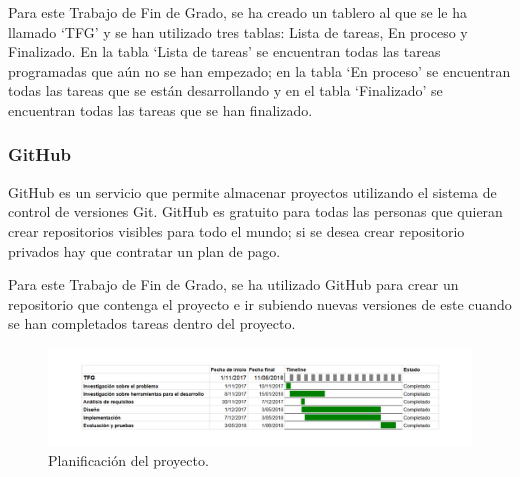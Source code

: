 Para este Trabajo de Fin de Grado, se ha creado un tablero al que se le ha llamado \enquote*{TFG} y se han utilizado tres tablas: Lista de tareas, En proceso y Finalizado. En la tabla \enquote*{Lista de tareas} se encuentran todas las tareas programadas que aún no se han empezado; en la tabla \enquote*{En proceso} se encuentran todas las tareas que se están desarrollando y en el tabla \enquote*{Finalizado} se encuentran todas las tareas que se han finalizado.
\subsubsection{GitHub}
GitHub \cite{github} es un servicio que permite almacenar proyectos utilizando el sistema de control de versiones Git. GitHub es gratuito para todas las personas que quieran crear repositorios visibles para todo el mundo; si se desea crear repositorio privados hay que contratar un plan de pago.\newline

Para este Trabajo de Fin de Grado, se ha utilizado GitHub para crear un repositorio que contenga el proyecto e ir subiendo nuevas versiones de este cuando se han completados tareas dentro del proyecto.\newline
\newpage
\begin{figure}[H]
	\centering
	\includegraphics[scale=0.55,angle=90]{imagenes/Gantt.png}
	\caption{Planificación del proyecto.}
	\label{fig:gantt}
\end{figure}
